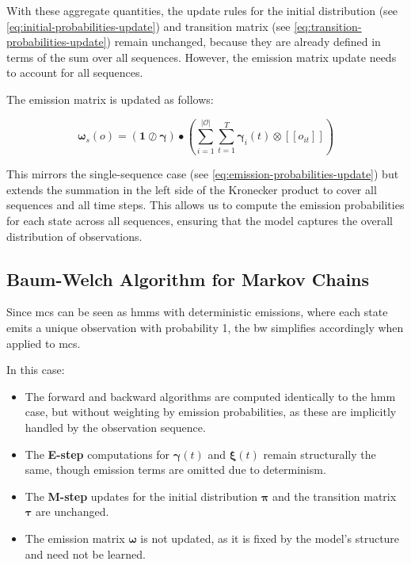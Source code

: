 With these aggregate quantities, the update rules for the initial distribution (see \autoref{eq:initial-probabilities-update}) and transition matrix (see \autoref{eq:transition-probabilities-update}) remain unchanged, because they are already defined in terms of the sum over all sequences.
However, the emission matrix update needs to account for all sequences.

The emission matrix is updated as follows:


\begin{equation}
    \pmb{\omega}
    _s(o) = (\mathbf{1} \oslash \pmb{\gamma}) \smblkcircle \left( \sum_{i=1}^{|\mathcal{O}|} \sum_{t=1}^{T} \pmb{\gamma}_i(t) \otimes [[o_{it}]] \right)
    \label{eq:omega-update}
\end{equation}


This mirrors the single-sequence case (see \autoref{eq:emission-probabilities-update}) but extends the summation in the left side of the Kronecker product to cover all sequences and all time steps.
This allows us to compute the emission probabilities for each state across all sequences, ensuring that the model captures the overall distribution of observations.

\subsection{Baum-Welch Algorithm for Markov Chains}\label{subsec:baum-welch-mc}
Since \glspl{mc} can be seen as \glspl{hmm} with deterministic emissions, where each state emits a unique observation with probability 1, the \gls{bw} simplifies accordingly when applied to \glspl{mc}.

In this case:

\begin{itemize}
    \item The forward and backward algorithms are computed identically to the \gls{hmm} case, but without weighting by emission probabilities, as these are implicitly handled by the observation sequence.
    \item The \textbf{E-step} computations for $\pmb{\gamma}(t)$ and $\pmb{\xi}(t)$ remain structurally the same, though emission terms are omitted due to determinism.
    \item The \textbf{M-step} updates for the initial distribution $\pmb{\pi}$ and the transition matrix $\pmb{\tau}$ are unchanged.
    \item The emission matrix $\pmb{\omega}$ is not updated, as it is fixed by the model's structure and need not be learned.
\end{itemize}

